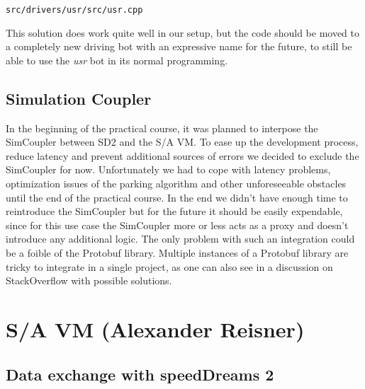 \documentclass[paper=a4, fontsize=11pt]{scrreprt}
\begin{document}
\begin{listing}[ht]
  \inputminted[firstline=751,linenos=true,lastline=755,gobble=4]{c++}{../../../simulators/speed-dreams/src/drivers/usr/src/usr.cpp}
  \caption{\texttt{src/drivers/usr/src/usr.cpp}}\label{aw_parked}
\end{listing}

This solution does work quite well in our setup,
but the code should be moved to a completely new driving bot with an expressive name for the future,
to still be able to use the \textit{usr} bot in its normal programming.

\section{Simulation Coupler}
In the beginning of the practical course,
it was planned to interpose the SimCoupler between SD2 and the S/A VM.
To ease up the development process, reduce latency and
prevent additional sources of errors we decided to exclude the SimCoupler for now.
Unfortunately we had to cope with latency problems,
optimization issues of the parking algorithm and other unforeseeable obstacles until the end of the practical course.
In the end we didn't have enough time to reintroduce the SimCoupler
but for the future it should be easily expendable,
since for this use case the SimCoupler more or less acts as a proxy
and doesn't introduce any additional logic.
The only problem with such an integration could be a foible of the Protobuf library.
Multiple instances of a Protobuf library are tricky to integrate in a single project,
as one can also see in a discussion on StackOverflow \cite{soprotobuf} with possible solutions.

\chapter{S/A VM (Alexander Reisner)}
\section{Data exchange with speedDreams 2}
\end{document}
